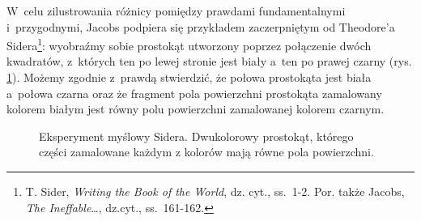 W~celu zilustrowania różnicy pomiędzy prawdami fundamentalnymi i~przygodnymi, Jacobs podpiera się przykładem zaczerpniętym od Theodore'a Sidera\footnote{T. Sider, \textit{Writing the Book of the World}, dz. cyt., ss.~1-2. Por. także Jacobs, \textit{The Ineffable}\ldots, dz.cyt., ss.~161-162.}: wyobraźmy sobie prostokąt utworzony poprzez połączenie dwóch kwadratów, z~których ten po lewej stronie jest biały a~ten po prawej czarny (rys. \ref{sil-jac-siderpic}). Możemy zgodnie z~prawdą stwierdzić, że połowa prostokąta jest biała a~połowa czarna oraz że fragment pola powierzchni prostokąta zamalowany kolorem białym jest równy polu powierzchni zamalowanej kolorem czarnym.
\begin{figure}[H]
\begin{center}


\caption[Eksperyment myślowy Sidera]{Eksperyment myślowy Sidera. Dwukolorowy prostokąt, którego części zamalowane każdym z kolorów mają równe pola powierzchni.}\label{sil-jac-siderpic}
\end{center}
\end{figure}

